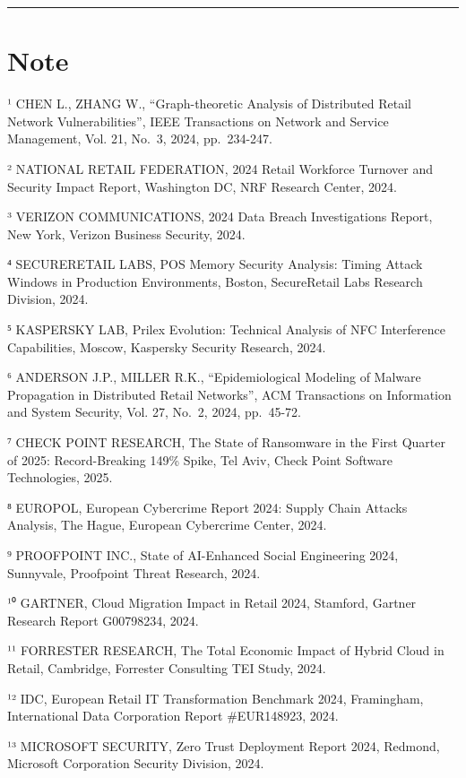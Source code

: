 \documentclass[12pt,a4paper,oneside]{book}
\numberwithin{figure}{chapter} %
\numberwithin{table}{chapter}  %
\begin{document}
\begin{center}\rule{0.5\linewidth}{0.5pt}\end{center}

\section{Note}\label{note-1}

¹ CHEN L., ZHANG W., ``Graph-theoretic Analysis of Distributed Retail
Network Vulnerabilities'', IEEE Transactions on Network and Service
Management, Vol. 21, No.~3, 2024, pp.~234-247.

² NATIONAL RETAIL FEDERATION, 2024 Retail Workforce Turnover and
Security Impact Report, Washington DC, NRF Research Center, 2024.

³ VERIZON COMMUNICATIONS, 2024 Data Breach Investigations Report, New
York, Verizon Business Security, 2024.

⁴ SECURERETAIL LABS, POS Memory Security Analysis: Timing Attack Windows
in Production Environments, Boston, SecureRetail Labs Research Division,
2024.

⁵ KASPERSKY LAB, Prilex Evolution: Technical Analysis of NFC
Interference Capabilities, Moscow, Kaspersky Security Research, 2024.

⁶ ANDERSON J.P., MILLER R.K., ``Epidemiological Modeling of Malware
Propagation in Distributed Retail Networks'', ACM Transactions on
Information and System Security, Vol. 27, No.~2, 2024, pp.~45-72.

⁷ CHECK POINT RESEARCH, The State of Ransomware in the First Quarter of
2025: Record-Breaking 149\% Spike, Tel Aviv, Check Point Software
Technologies, 2025.

⁸ EUROPOL, European Cybercrime Report 2024: Supply Chain Attacks
Analysis, The Hague, European Cybercrime Center, 2024.

⁹ PROOFPOINT INC., State of AI-Enhanced Social Engineering 2024,
Sunnyvale, Proofpoint Threat Research, 2024.

¹⁰ GARTNER, Cloud Migration Impact in Retail 2024, Stamford, Gartner
Research Report G00798234, 2024.

¹¹ FORRESTER RESEARCH, The Total Economic Impact of Hybrid Cloud in
Retail, Cambridge, Forrester Consulting TEI Study, 2024.

¹² IDC, European Retail IT Transformation Benchmark 2024, Framingham,
International Data Corporation Report \#EUR148923, 2024.

¹³ MICROSOFT SECURITY, Zero Trust Deployment Report 2024, Redmond,
Microsoft Corporation Security Division, 2024.
\end{document}
